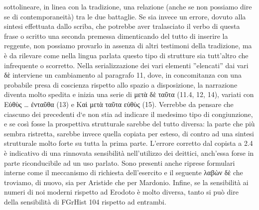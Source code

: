 sottolineare, in linea con la tradizione, una relazione (anche se non
possiamo dire se di contemporaneità) tra le due battaglie. Se sia
invece un errore, dovuto alla sintesi effettuata dallo scriba, che
potrebbe aver tralasciato il verbo di questa frase
o scritto una seconda premessa dimenticando del tutto di inserire la
reggente, non possiamo provarlo in assenza di altri testimoni della
tradizione, ma è da rilevare come nella lingua parlata questo tipo di
strutture sia tutt'altro che infrequente o
scorretto. Nella
serializzazione dei vari elementi ''elencati'' dai vari \textgreek{δὲ} interviene un cambiamento al paragrafo 11, dove, in concomitanza con una
probabile presa di coscienza rispetto allo spazio a disposizione, la
narrazione diventa molto spedita e inizia una serie di
\textgreek{μετὰ δὲ ταῦτα} (11.4,
12, 14), variati con  \textgreek{Εὐθὺς … ἐνταῦθα} (13) e \textgreek{Καὶ μετὰ ταῦτα εὐθὺς} (15). Verrebbe da pensare che ciascuno dei precedenti \textgreek{d`e
}non stia ad indicare il medesimo tipo di congiunzione, e se così fosse la
prospettiva strutturale sarebbe del tutto diversa: la parte che più sembra
ristretta, sarebbe invece quella copiata per esteso, di contro ad una sintesi
strutturale molto forte su tutta la prima parte. 
L'errore corretto dal copista a
2.4 è indicativo di una rinnovata sensibilità nell'utilizzo
dei deittici, anch'essa forse in parte riconducibile ad un
uso parlato. Sono presenti anche riprese formulari interne come il meccanismo
di richiesta dell'esercito e il
seguente \textgreek{λαβὼν δὲ} che troviamo, di
nuovo, sia per Aristide che per Mardonio. Infine, se
la sensibilità ai numeri di noi moderni rispetto
ad Erodoto è molto diversa, tanto si può dire della sensibilità di FGrHist 104
rispetto ad entrambi.

